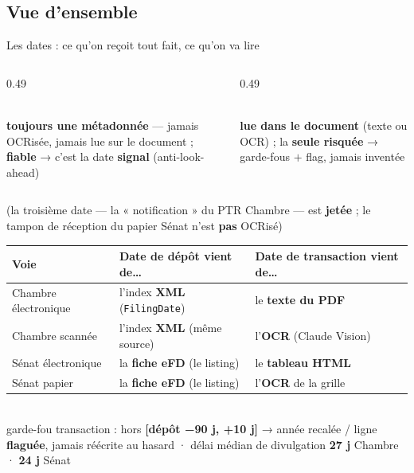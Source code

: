 \documentclass[11pt,aspectratio=169]{beamer}
\newcommand{\co}[1]{\texttt{#1}}
\begin{document}
\subsection{Vue d'ensemble}
\begin{frame}{Les dates : ce qu'on reçoit tout fait, ce qu'on va lire}
  \centering
  \vspace{0.5mm}
  \begin{columns}[T]
    \begin{column}{0.49\textwidth}\centering
      \colorbox{okgreen}{\parbox{0.94\linewidth}{\centering{}\vspace{0.4mm}}}\\[1.5mm]
      {\footnotesize \textbf{toujours une métadonnée} --- jamais OCRisée, jamais lue sur le document ; \textbf{fiable} → c'est la date \textbf{signal} (anti-look-ahead)}
    \end{column}
    \begin{column}{0.49\textwidth}\centering
      \colorbox{warnorange}{\parbox{0.94\linewidth}{\centering{}\vspace{0.4mm}}}\\[1.5mm]
      {\footnotesize \textbf{lue dans le document} (texte ou OCR) ; la \textbf{seule risquée} → garde-fous $+$ flag, jamais inventée}
    \end{column}
  \end{columns}
  \vspace{2mm}
  {\scriptsize\color{black!55} (la troisième date --- la « notification » du PTR Chambre --- est \textbf{jetée} ; le tampon de réception du papier Sénat n'est \textbf{pas} OCRisé)}\\[2.5mm]
  {\footnotesize
  \begin{tabular}{@{}lll@{}}
    \toprule
    \textbf{Voie} & \textbf{Date de dépôt} vient de… & \textbf{Date de transaction} vient de… \\
    \midrule
    Chambre électronique & l'index \textbf{XML} (\co{FilingDate}) & le \textbf{texte du PDF} \\
    Chambre scannée & l'index \textbf{XML} (même source) & l'\textbf{OCR} (Claude Vision) \\
    Sénat électronique & la \textbf{fiche eFD} (le listing) & le \textbf{tableau HTML} \\
    Sénat papier & la \textbf{fiche eFD} (le listing) & l'\textbf{OCR} de la grille \\
    \bottomrule
  \end{tabular}}\\[2.5mm]
  {\scriptsize\color{black!60} garde-fou transaction : hors \textbf{[dépôt −90 j, +10 j]} → année recalée / ligne \textbf{flaguée}, jamais réécrite au hasard \;·\; délai médian de divulgation \textbf{27 j} Chambre · \textbf{24 j} Sénat}
\end{frame}
\end{document}
